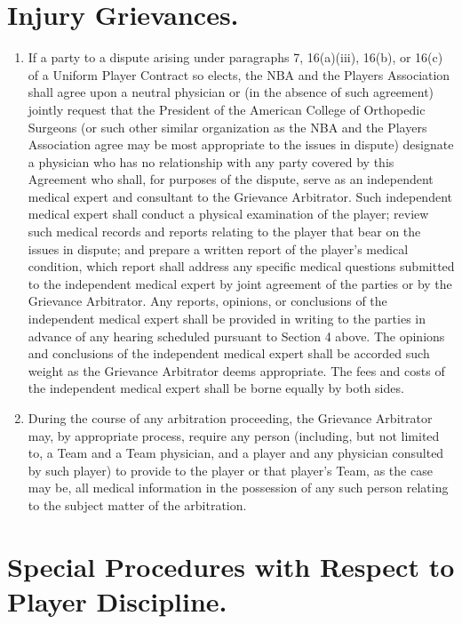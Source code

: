 \documentclass[
]{book}
\providecommand{\tightlist}{%
  \setlength{\itemsep}{0pt}\setlength{\parskip}{0pt}}
\begin{document}
\hypertarget{injury-grievances.}{%
\section{Injury Grievances.}\label{injury-grievances.}}

\begin{enumerate}
\def\labelenumi{(\alph{enumi})}
\tightlist
\item
  If a party to a dispute arising under paragraphs 7, 16(a)(iii), 16(b), or 16(c) of a Uniform Player Contract so elects, the NBA and the Players Association shall agree upon a neutral physician or (in the absence of such agreement) jointly request that the President of the American College of Orthopedic Surgeons (or such other similar organization as the NBA and the Players Association agree may be most appropriate to the issues in dispute) designate a physician who has no relationship with any party covered by this Agreement who shall, for purposes of the dispute, serve as an independent medical expert and consultant to the Grievance Arbitrator. Such independent medical expert shall conduct a physical examination of the player; review such medical records and reports relating to the player that bear on the issues in dispute; and prepare a written report of the player's medical condition, which report shall address any specific medical questions submitted to the independent medical expert by joint agreement of the parties or by the Grievance Arbitrator. Any reports, opinions, or conclusions of the independent medical expert shall be provided in writing to the parties in advance of any hearing scheduled pursuant to Section 4 above. The opinions and conclusions of the independent medical expert shall be accorded such weight as the Grievance Arbitrator deems appropriate. The fees and costs of the independent medical expert shall be borne equally by both sides.
\item
  During the course of any arbitration proceeding, the Grievance Arbitrator may, by appropriate process, require any person (including, but not limited to, a Team and a Team physician, and a player and any physician consulted by such player) to provide to the player or that player's Team, as the case may be, all medical information in the possession of any such person relating to the subject matter of the arbitration.
\end{enumerate}

\hypertarget{special-procedures-with-respect-to-player-discipline.}{%
\section{Special Procedures with Respect to Player Discipline.}\label{special-procedures-with-respect-to-player-discipline.}}
\end{document}
